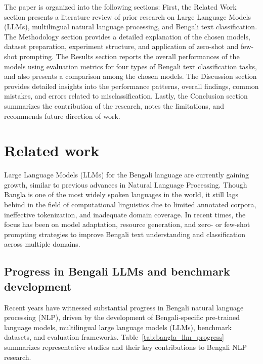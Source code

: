 \documentclass[10pt,letterpaper]{article}
\begin{document}
The paper is organized into the following sections: First, the Related Work section presents a literature review of prior research on Large Language Models (LLMs), multilingual natural language processing, and Bengali text classification. The Methodology section provides a detailed explanation of the chosen models, dataset preparation, experiment structure, and application of zero-shot and few-shot prompting. The Results section reports the overall performances of the models using evaluation metrics for four types of Bengali text classification tasks, and also presents a comparison among the chosen models. The Discussion section provides detailed insights into the performance patterns, overall findings, common mistakes, and errors related to misclassification. Lastly, the Conclusion section summarizes the contribution of the research, notes the limitations, and recommends future direction of work.



\section*{Related work}
\label{sec:related}

Large Language Models (LLMs) for the Bengali language are currently gaining growth, similar to previous advances in Natural Language Processing. Though Bangla is one of the most widely spoken languages in the world, it still lags behind in the field of computational linguistics due to limited annotated corpora, ineffective tokenization, and inadequate domain coverage. In recent times, the focus has been on model adaptation, resource generation, and zero- or few-shot prompting strategies to improve Bengali text understanding and classification across multiple domains.

\subsection*{Progress in Bengali LLMs and benchmark development}

Recent years have witnessed substantial progress in Bengali natural language processing (NLP), driven by the development of Bengali-specific pre-trained language models, multilingual large language models (LLMs), benchmark datasets, and evaluation frameworks. Table~\ref{tab:bangla_llm_progress} summarizes representative studies and their key contributions to Bengali NLP research.
\end{document}
